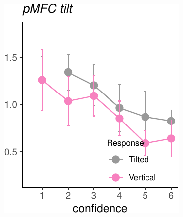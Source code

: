 \documentclass[]{article}
\begin{document}
\includegraphics{Chudi-Thesis_files/figure-latex/unnamed-chunk-9-3.pdf}
~

~
\end{document}
